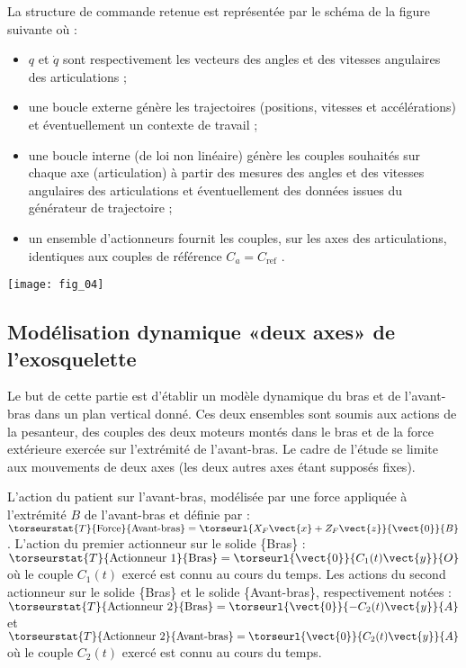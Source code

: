\begin{multicols}{2}
La structure de commande retenue est représentée par le schéma de la figure suivante où :
\begin{itemize}
\item $q$ et $\dot{q}$ sont respectivement les vecteurs des angles et des vitesses angulaires des articulations ;
\item une boucle externe génère les trajectoires (positions, vitesses et accélérations) et éventuellement un contexte de travail ;
\item une boucle interne (de loi non linéaire) génère les couples souhaités sur chaque axe (articulation) à partir des mesures des angles et des vitesses angulaires des articulations et éventuellement des données issues du générateur de trajectoire ;
\item  un ensemble d’actionneurs fournit les couples, sur les axes des articulations, identiques aux couples de
référence $C_a = C_{\text{ref}}$ .
\end{itemize}

\begin{center}
\texttt{[image: fig\_04]}
\end{center}

\newpage

\subsection*{Modélisation dynamique «deux axes» de l’exosquelette}

\begin{obj}
Le but de cette partie est d’établir un modèle dynamique du bras et de l’avant-bras dans un plan vertical
donné. Ces deux ensembles sont soumis aux actions de la pesanteur, des couples des deux moteurs montés
dans le bras et de la force extérieure exercée sur l’extrémité de l’avant-bras. Le cadre de l’étude se limite
aux mouvements de deux axes (les deux autres axes étant supposés fixes).
\end{obj}

L’action du patient sur l’avant-bras, modélisée par une force appliquée à l’extrémité $B$ de l’avant-bras et
définie par : 
$\torseurstat{T}{\text{Force}}{\text{Avant-bras}}=\torseurl{X_F\vect{x}+Z_F\vect{z}}{\vect{0}}{B}$. 
L’action du premier actionneur sur le solide \{Bras\} : $\torseurstat{T}{\text{Actionneur 1}}{\text{Bras}}=\torseurl{\vect{0}}{C_1(t) \vect{y}}{O}$ où le couple $C_1(t)$ exercé est connu au cours du temps.
Les actions du second actionneur sur le solide \{Bras\} et le solide \{Avant-bras\}, respectivement notées :
$\torseurstat{T}{\text{Actionneur 2}}{\text{Bras}}=\torseurl{\vect{0}}{-C_2(t) \vect{y}}{A}$ et 
$\torseurstat{T}{\text{Actionneur 2}}{\text{Avant-bras}}=\torseurl{\vect{0}}{C_2(t) \vect{y}}{A}$ où le couple $C_2(t)$ exercé est connu au cours du temps.


\end{multicols}
